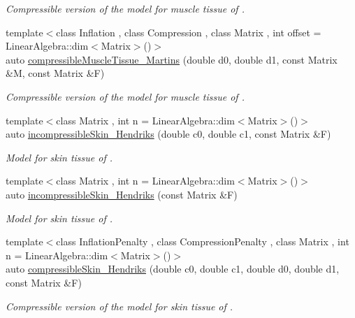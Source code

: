 \begin{DoxyCompactItemize}
\begin{DoxyCompactList}\small\item\em Compressible version of the model for muscle tissue of \cite{Martins1998}. \end{DoxyCompactList}\item 
{\footnotesize template$<$class Inflation , class Compression , class Matrix , int offset = Linear\-Algebra\-::dim$<$\-Matrix$>$()$>$ }\\auto \hyperlink{group__Biomechanics_ga073cb35106dcb176a580bab290bc8422}{compressible\-Muscle\-Tissue\-\_\-\-Martins} (double d0, double d1, const Matrix \&M, const Matrix \&F)
\begin{DoxyCompactList}\small\item\em Compressible version of the model for muscle tissue of \cite{Martins1998}. \end{DoxyCompactList}\item 
{\footnotesize template$<$class Matrix , int n = Linear\-Algebra\-::dim$<$\-Matrix$>$()$>$ }\\auto \hyperlink{group__Biomechanics_ga4d27dc5aefb556c1fa7ef71e6549de96}{incompressible\-Skin\-\_\-\-Hendriks} (double c0, double c1, const Matrix \&F)
\begin{DoxyCompactList}\small\item\em Model for skin tissue of \cite{Hendriks2005}. \end{DoxyCompactList}\item 
{\footnotesize template$<$class Matrix , int n = Linear\-Algebra\-::dim$<$\-Matrix$>$()$>$ }\\auto \hyperlink{group__Biomechanics_ga2e1b8683d6c9cb90d2b8425f1bb1247b}{incompressible\-Skin\-\_\-\-Hendriks} (const Matrix \&F)
\begin{DoxyCompactList}\small\item\em Model for skin tissue of \cite{Hendriks2005}. \end{DoxyCompactList}\item 
{\footnotesize template$<$class Inflation\-Penalty , class Compression\-Penalty , class Matrix , int n = Linear\-Algebra\-::dim$<$\-Matrix$>$()$>$ }\\auto \hyperlink{group__Biomechanics_gac0b05f2d4c1323387e305d07163ba5de}{compressible\-Skin\-\_\-\-Hendriks} (double c0, double c1, double d0, double d1, const Matrix \&F)
\begin{DoxyCompactList}\small\item\em Compressible version of the model for skin tissue of \cite{Hendriks2005}. \end{DoxyCompactList}\item 

\end{DoxyCompactItemize}
